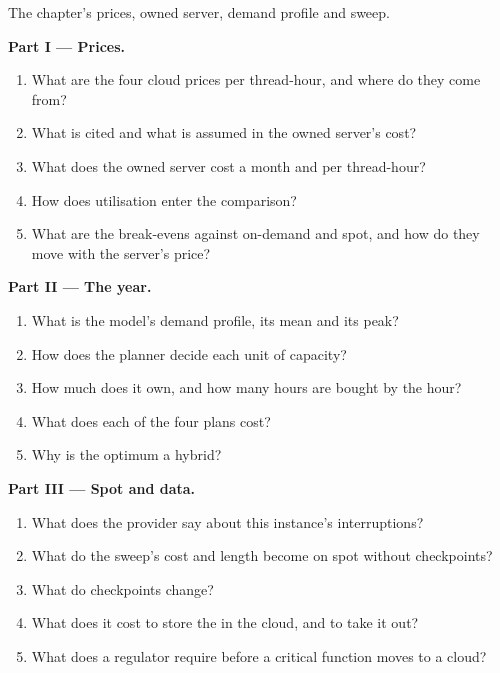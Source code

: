 \begin{problem}\label{pb:pl:cloud-against-on-premises:1}
The chapter's prices, owned server, demand profile and sweep.

\medskip\noindent\textbf{Part I --- Prices.}
\begin{enumerate}
\item What are the four cloud prices per thread-hour, and where do they come from?
\item What is cited and what is assumed in the owned server's cost?
\item What does the owned server cost a month and per thread-hour?
\item How does utilisation enter the comparison?
\item What are the break-evens against on-demand and spot, and how do they move with the server's price?
\end{enumerate}

\medskip\noindent\textbf{Part II --- The year.}
\begin{enumerate}[resume]
\item What is the model's demand profile, its mean and its peak?
\item How does the planner decide each unit of capacity?
\item How much does it own, and how many hours are bought by the hour?
\item What does each of the four plans cost?
\item Why is the optimum a hybrid?
\end{enumerate}

\medskip\noindent\textbf{Part III --- Spot and data.}
\begin{enumerate}[resume]
\item What does the provider say about this instance's interruptions?
\item What do the sweep's cost and length become on spot without checkpoints?
\item What do checkpoints change?
\item What does it cost to store the  in the cloud, and to take it out?
\item What does a regulator require before a critical function moves to a cloud?
\end{enumerate}


\end{problem}
